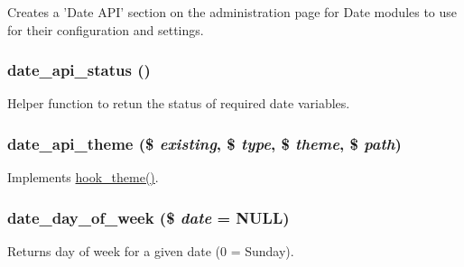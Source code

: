 Creates a 'Date API' section on the administration page for Date modules to use for their configuration and settings. \hypertarget{date__api_8module_a0dd6c7186e678394270216b9d241c729}{
\subsubsection[{date\_\-api\_\-status}]{\setlength{\rightskip}{0pt plus 5cm}date\_\-api\_\-status ()}}
\label{date__api_8module_a0dd6c7186e678394270216b9d241c729}
Helper function to retun the status of required date variables. \hypertarget{date__api_8module_a9a35f6b3d4939f8df7d17ba1758aff7f}{
\subsubsection[{date\_\-api\_\-theme}]{\setlength{\rightskip}{0pt plus 5cm}date\_\-api\_\-theme (\$ {\em existing}, \/  \$ {\em type}, \/  \$ {\em theme}, \/  \$ {\em path})}}
\label{date__api_8module_a9a35f6b3d4939f8df7d17ba1758aff7f}
Implements \hyperlink{group__hooks_ga013ccb45c7aaab1c16cf9691428c910d}{hook\_\-theme()}. \hypertarget{date__api_8module_aeba2cb02e4bee3560f69941fa4b2337a}{
\subsubsection[{date\_\-day\_\-of\_\-week}]{\setlength{\rightskip}{0pt plus 5cm}date\_\-day\_\-of\_\-week (\$ {\em date} = {\ttfamily NULL})}}
\label{date__api_8module_aeba2cb02e4bee3560f69941fa4b2337a}
Returns day of week for a given date (0 = Sunday).


